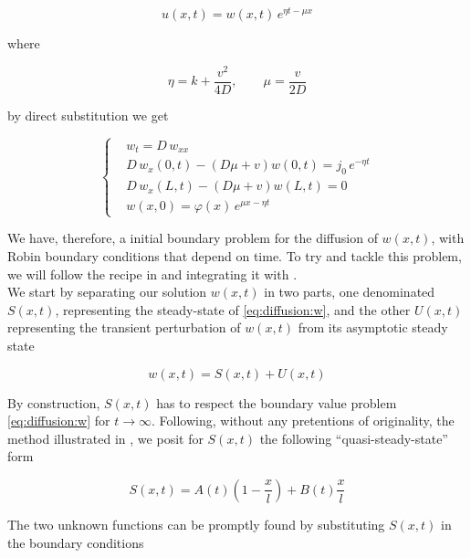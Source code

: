 \documentclass[a4paper, 10pt]{article}
\begin{document}
  \begin{equation}\label{eq:change}
    u(x,t) = w(x,t) \, e^{\eta t - \mu x}  
  \end{equation}

  where

  \begin{equation}
    \eta = k + \frac{v^2}{4D}, \qquad \mu = \frac{v}{2D}
  \end{equation}
  
  by direct substitution we get 

  \begin{equation}\label{eq:diffusion:w}
    \left\{ \begin{aligned}
      &w_t = D \, w_{xx}\\
      &D \, w_x(0, t)  - (D \mu + v) w(0,t)  = j_0 \, e^{-\eta t}\\
      &D \, w_x(L, t)  - (D \mu + v) w(L,t)  = 0\\
      &w(x,0) = \varphi(x) \, e^{\mu x - \eta t} 
    \end{aligned}\right.
  \end{equation}
  
  We have, therefore, a initial boundary problem for the diffusion of $w(x,t)$,
  with Robin boundary conditions that depend on time. To try and tackle this
  problem, we will follow the recipe in \cite{Drbek2007ElementsOP} and
  integrating it with \cite{Salsa2022PartialDE}.\\ 
  We start by separating our solution $w(x,t)$ in two parts, one denominated
  $S(x,t)$, representing the steady-state of \eqref{eq:diffusion:w}, and the
  other $U(x,t)$ representing the transient perturbation of $w(x,t)$ from its
  asymptotic steady state

  \begin{equation}
    w(x,t) = S(x,t) + U(x,t)
  \end{equation}
  
  By construction, $S(x,t)$ has to respect the boundary value problem
  \eqref{eq:diffusion:w} for $t \to \infty$. Following, without any pretentions
  of originality, the method illustrated in \cite{Drbek2007ElementsOP}, we posit
  for $S(x,t)$ the following ``quasi-steady-state'' form

  \begin{equation}
    S(x,t) = A(t) \left(1 - \frac{x}{l}\right) + B(t)\frac{x}{l}
  \end{equation}

  The two unknown functions can be promptly found by substituting $S(x,t)$ in
  the boundary conditions
\end{document}
